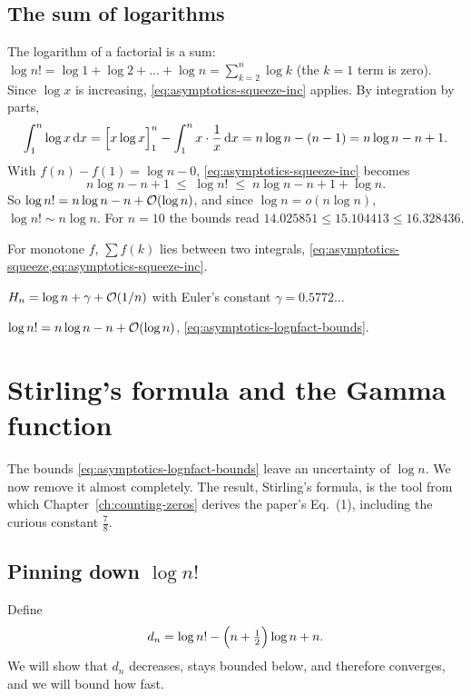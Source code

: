 \subsection{The sum of logarithms}

The logarithm of a factorial is a sum: $\log n!=\log1+\log2+\dots+\log n=\sum_{k=2}^n\log k$ (the $k=1$ term is zero). Since $\log x$ is increasing, \cref{eq:asymptotics-squeeze-inc} applies. By integration by parts,
\[
\int_1^n\log x\,\mathrm{d} x=\Bigl[x\log x\Bigr]_1^n-\int_1^n x\cdot\frac1x\,\mathrm{d} x=n\log n-(n-1)=n\log n-n+1 .
\]
With $f(n)-f(1)=\log n-0$, \cref{eq:asymptotics-squeeze-inc} becomes
\begin{equation}
n\log n-n+1\;\le\;\log n!\;\le\;n\log n-n+1+\log n .
\label{eq:asymptotics-lognfact-bounds}
\end{equation}
So $\log n!=n\log n-n+\mathcal{O}(\log n)$, and since $\log n=o(n\log n)$, $\log n!\sim n\log n$. For $n=10$ the bounds read $14.025851\le15.104413\le16.328436$.

\begin{keyideas}
\item For monotone $f$, $\sum f(k)$ lies between two integrals, \cref{eq:asymptotics-squeeze,eq:asymptotics-squeeze-inc}.
\item $H_n=\log n+\gamma+\mathcal{O}(1/n)$ with Euler's constant $\gamma=0.5772\ldots$
\item $\log n!=n\log n-n+\mathcal{O}(\log n)$, \cref{eq:asymptotics-lognfact-bounds}.
\end{keyideas}

\section{Stirling's formula and the Gamma function}\label{sec:asymptotics-stirling}

The bounds \cref{eq:asymptotics-lognfact-bounds} leave an uncertainty of $\log n$. We now remove it almost completely. The result, Stirling's formula, is the tool from which Chapter~\ref{ch:counting-zeros} derives the paper's Eq.~(1), including the curious constant $\tfrac78$.

\subsection{Pinning down $\log n!$}

Define
\begin{equation}
d_n=\log n!-\Bigl(n+\tfrac12\Bigr)\log n+n .
\label{eq:asymptotics-dn}
\end{equation}
We will show that $d_n$ decreases, stays bounded below, and therefore converges, and we will bound how fast.

